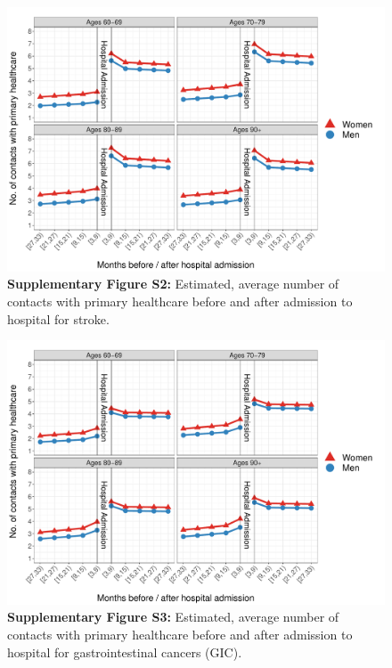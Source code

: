 	\begin{figure}[H]
		\centering
		\includegraphics[scale=0.435]{Paper_2/SUPP_Figure_2_STROKE.pdf}
		\caption*{\textbf{Supplementary Figure S2:} Estimated, average number of contacts with 
													primary healthcare before and after admission 
													to hospital for stroke.}
	\label{ch3:figS2}
	\end{figure}
	
	\begin{figure}[H]
		\centering
		\includegraphics[scale=0.435]{Paper_2/SUPP_Figure_3_GIC.pdf}
		\caption*{\textbf{Supplementary Figure S3:} Estimated, average number of contacts with 
													primary healthcare before and after admission 
													to hospital for gastrointestinal cancers (GIC).}
	\label{ch3:figS3}
	\end{figure}


